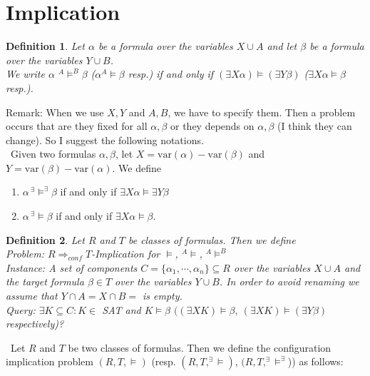 \documentclass[12pt]{article}
\newcommand{\AMB}{\mbox{$^A$\hspace{-0.5mm}$\models^B$}}
\newcommand{\AM}{\mbox{$^A$\hspace{-0.5mm}$\models$}}
\newtheorem{definition}{Definition}[section]
\begin{document}
\section{Implication}
\begin{definition}
Let $\alpha$ be a formula over the variables $X \cup A$ and let $\beta$ be a formula over the variables $Y \cup B$.\\
We write $\alpha $ \AMB $\beta$ ($\alpha $\AM $\beta$ resp.) if and only if
$(\exists X \alpha) \models (\exists Y \beta)$ ($\exists X \alpha \models \beta$ resp.).
\end{definition}

\color{red}
\noindent Remark: When we use $X,Y$ and $A, B$, we have to specify them. Then a problem occurs that are they fixed for all $\alpha, \beta$ or they depends on $\alpha, \beta$ (I think they can change). So I suggest the following notations.\\

\ 
Given two formulas $\alpha,\beta$, let $X=\mbox{var}(\alpha)-\mbox{var}(\beta)$ and $Y=\mbox{var}(\beta)-\mbox{var}(\alpha)$. We define
\begin{enumerate}
\item $\alpha\, ^\exists\!\!\models^\exists \beta$ if and only if $\exists X\alpha\models \exists Y\beta$

\item $\alpha\, ^\exists\!\!\models \beta$ if and only if $\exists X \alpha\models \beta$.
\end{enumerate}
\color{black}


\begin{definition}
 Let $R$ and $T$ be classes of formulas. Then we define\\
{\em Problem:  $R \Longrightarrow_{conf} T$-Implication for $\models$, \AM, \AMB}\\
{\em Instance}: A set of components $C=\{\alpha_1,\cdots,\alpha_n\} \subseteq R$ over the variables $X \cup A$ and the target formula $\beta \in T$ over the variables $Y \cup B$. In order to avoid renaming we assume that $Y \cap A= X \cap B=$ is empty.\\
{\em Query}:
 $ \exists K \subseteq C: K \in$ SAT and $K \models \beta$ $((\exists X K)  \models \beta, \
(\exists X K) \models (\exists Y \beta)$ respectively)?\\
\end{definition}

\color{red}
\ Let $R$ and $T$ be two classes of formulas. Then we define the configuration implication problem
$(R, T, \models)$ (resp. $(R, T, ^\exists\!\models)$, $(R, T,^\exists\!\models^\exists$)) as follows:
\end{document}
